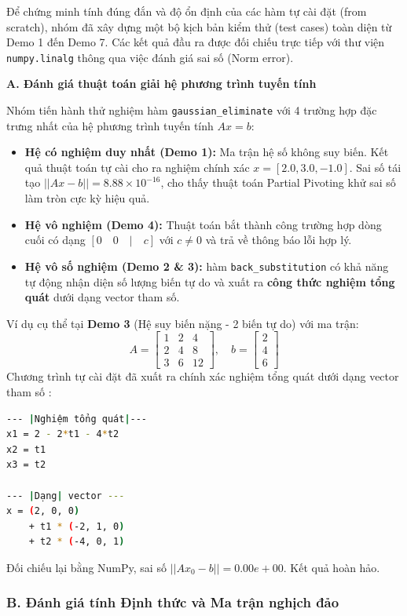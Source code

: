 Để chứng minh tính đúng đắn và độ ổn định của các hàm tự cài đặt (from scratch), nhóm đã xây dựng một bộ kịch bản kiểm thử (test cases) toàn diện từ Demo 1 đến Demo 7. Các kết quả đầu ra được đối chiếu trực tiếp với thư viện \texttt{numpy.linalg} thông qua việc đánh giá sai số (Norm error).

\textbf{A. Đánh giá thuật toán giải hệ phương trình tuyến tính}

Nhóm tiến hành thử nghiệm hàm \texttt{gaussian\_eliminate} với 4 trường hợp đặc trưng nhất của hệ phương trình tuyến tính $Ax = b$:
\begin{itemize}
    \item \textbf{Hệ có nghiệm duy nhất (Demo 1):} Ma trận hệ số không suy biến. Kết quả thuật toán tự cài cho ra nghiệm chính xác $x = [2.0, 3.0, -1.0]$. Sai số tái tạo $||Ax - b|| = 8.88 \times 10^{-16}$, cho thấy thuật toán Partial Pivoting khử sai số làm tròn cực kỳ hiệu quả.
    \item \textbf{Hệ vô nghiệm (Demo 4):} Thuật toán bắt thành công trường hợp dòng cuối có dạng $[0 \quad 0 \quad | \quad c]$ với $c \neq 0$ và trả về thông báo lỗi hợp lý.
    \item \textbf{Hệ vô số nghiệm (Demo 2 \& 3):} hàm  \texttt{back\_substitution} có khả năng tự động nhận diện số lượng biến tự do và xuất ra \textbf{công thức nghiệm tổng quát} dưới dạng vector tham số.
\end{itemize}

Ví dụ cụ thể tại \textbf{Demo 3} (Hệ suy biến nặng - 2 biến tự do) với ma trận:
$$
A = \begin{bmatrix} 1 & 2 & 4 \\ 2 & 4 & 8 \\ 3 & 6 & 12 \end{bmatrix}, \quad 
b = \begin{bmatrix} 2 \\ 4 \\ 6 \end{bmatrix}
$$
Chương trình tự cài đặt đã xuất ra chính xác nghiệm tổng quát dưới dạng vector tham số :
\begin{lstlisting}[language=bash, numbers=none,escapechar=|]
--- |Nghiệm tổng quát|---
x1 = 2 - 2*t1 - 4*t2
x2 = t1
x3 = t2

--- |Dạng| vector ---
x = (2, 0, 0)
    + t1 * (-2, 1, 0)
    + t2 * (-4, 0, 1)
\end{lstlisting}
Đối chiếu lại bằng NumPy, sai số $||Ax_0 - b|| = 0.00e+00$. Kết quả hoàn hảo.

\subsubsection*{B. Đánh giá tính Định thức và Ma trận nghịch đảo}

